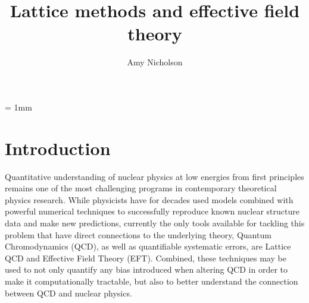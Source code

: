 %
%
\newcommand{\mybar}[1]%
        {\kern 0.6pt\overline{\kern -0.6pt#1\kern -0.6pt}\kern 0.6pt}
\newcommand{\drawsquare}[2]{\hbox{%
\rule{#2pt}{#1pt}\hskip-#2pt%
\rule{#1pt}{#2pt}\hskip-#1pt%
\rule[#1pt]{#1pt}{#2pt}}\rule[#1pt]{#2pt}{#2pt}\hskip-#2pt%
\rule{#2pt}{#1pt}}%
\newcommand{\Yfund}{\raisebox{-.5pt}{\drawsquare{6.5}{0.4}}}%
\newcommand{\Ybarfund}{\mybar{\raisebox{-.5pt}{\drawsquare{6.5}{0.4}}}}%

%
\title{Lattice methods and effective field theory}
\author{Amy Nicholson}
\maketitle
{}
\unitlength = 1mm


\section{\label{sec:intro}Introduction}
Quantitative understanding of nuclear physics at low energies from first principles remains one of the most challenging programs in contemporary theoretical physics research. While physicists have for decades used models combined with powerful numerical techniques to successfully reproduce known nuclear structure data and make new predictions, currently the only tools available for tackling this problem that have direct connections to the underlying theory, Quantum Chromodynamics (QCD), as well as quantifiable systematic errors, are Lattice QCD and Effective Field Theory (EFT). Combined, these techniques may be used to not only quantify any bias introduced when altering QCD in order to make it computationally tractable, but also to better understand the connection between QCD and nuclear physics.

